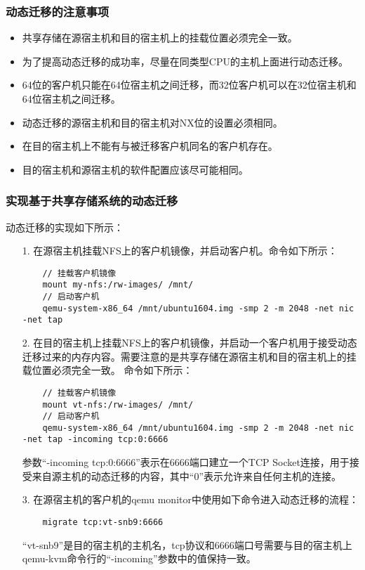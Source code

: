 \documentclass[a4paper,left=2.5cm,right=2.5cm,11pt]{article}
\begin{document}
\subsubsection{动态迁移的注意事项}
	\begin{itemize}
		\item 共享存储在源宿主机和目的宿主机上的挂载位置必须完全一致。
		\item 为了提高动态迁移的成功率，尽量在同类型CPU的主机上面进行动态迁移。
		\item 64位的客户机只能在64位宿主机之间迁移，而32位客户机可以在32位宿主机和64位宿主机之间迁移。
		\item 动态迁移的源宿主机和目的宿主机对NX位的设置必须相同。
		\item 在目的宿主机上不能有与被迁移客户机同名的客户机存在。
		\item 目的宿主机和源宿主机的软件配置应该尽可能相同。
	\end{itemize}

\subsubsection{实现基于共享存储系统的动态迁移}
	动态迁移的实现如下所示：
	\begin{itemize}
		\item[1.] 在源宿主机挂载NFS上的客户机镜像，并启动客户机。命令如下所示：
		\begin{lstlisting}
	// 挂载客户机镜像
	mount my-nfs:/rw-images/ /mnt/
	// 启动客户机
	qemu-system-x86_64 /mnt/ubuntu1604.img -smp 2 -m 2048 -net nic -net tap
		\end{lstlisting}

		\item[2.] 在目的宿主机上挂载NFS上的客户机镜像，并启动一个客户机用于接受动态迁移过来的内存内容。需要注意的是共享存储在源宿主机和目的宿主机上的挂载位置必须完全一致。
		命令如下所示：
		\begin{lstlisting}
	// 挂载客户机镜像
	mount vt-nfs:/rw-images/ /mnt/
	// 启动客户机
	qemu-system-x86_64 /mnt/ubuntu1604.img -smp 2 -m 2048 -net nic -net tap -incoming tcp:0:6666
		\end{lstlisting}

		参数“-incoming tcp:0:6666”表示在6666端口建立一个TCP Socket连接，用于接受来自源主机的动态迁移的内容，其中“0”表示允许来自任何主机的连接。

		\item[3.] 在源宿主机的客户机的qemu monitor中使用如下命令进入动态迁移的流程：
		\begin{lstlisting}
	migrate tcp:vt-snb9:6666
		\end{lstlisting}

		“vt-snb9”是目的宿主机的主机名，tcp协议和6666端口号需要与目的宿主机上qemu-kvm命令行的“-incoming”参数中的值保持一致。
	\end{itemize}
\end{document}
